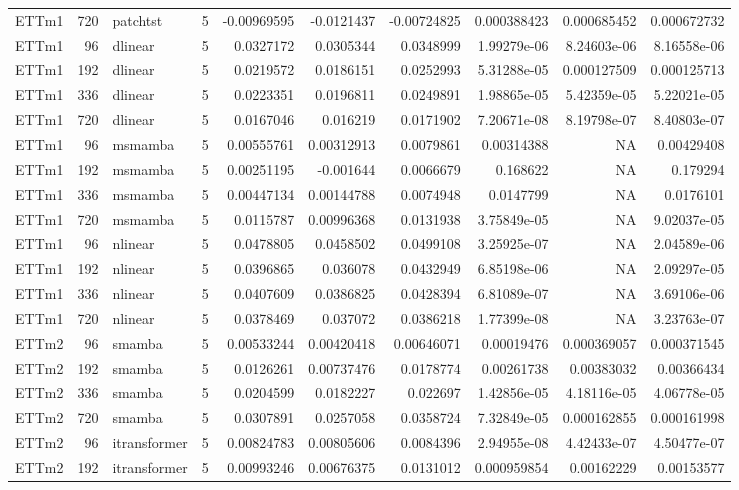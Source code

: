 \begin{longtable}{lrllrrrrrr}
ETTm1 & 720 & patchtst & 5 & -0.00969595 & -0.0121437 & -0.00724825 & 0.000388423 & 0.000685452 & 0.000672732 \\
ETTm1 & 96 & dlinear & 5 & 0.0327172 & 0.0305344 & 0.0348999 & 1.99279e-06 & 8.24603e-06 & 8.16558e-06 \\
ETTm1 & 192 & dlinear & 5 & 0.0219572 & 0.0186151 & 0.0252993 & 5.31288e-05 & 0.000127509 & 0.000125713 \\
ETTm1 & 336 & dlinear & 5 & 0.0223351 & 0.0196811 & 0.0249891 & 1.98865e-05 & 5.42359e-05 & 5.22021e-05 \\
ETTm1 & 720 & dlinear & 5 & 0.0167046 & 0.016219 & 0.0171902 & 7.20671e-08 & 8.19798e-07 & 8.40803e-07 \\
ETTm1 & 96 & msmamba & 5 & 0.00555761 & 0.00312913 & 0.0079861 & 0.00314388 & NA & 0.00429408 \\
ETTm1 & 192 & msmamba & 5 & 0.00251195 & -0.001644 & 0.0066679 & 0.168622 & NA & 0.179294 \\
ETTm1 & 336 & msmamba & 5 & 0.00447134 & 0.00144788 & 0.0074948 & 0.0147799 & NA & 0.0176101 \\
ETTm1 & 720 & msmamba & 5 & 0.0115787 & 0.00996368 & 0.0131938 & 3.75849e-05 & NA & 9.02037e-05 \\
ETTm1 & 96 & nlinear & 5 & 0.0478805 & 0.0458502 & 0.0499108 & 3.25925e-07 & NA & 2.04589e-06 \\
ETTm1 & 192 & nlinear & 5 & 0.0396865 & 0.036078 & 0.0432949 & 6.85198e-06 & NA & 2.09297e-05 \\
ETTm1 & 336 & nlinear & 5 & 0.0407609 & 0.0386825 & 0.0428394 & 6.81089e-07 & NA & 3.69106e-06 \\
ETTm1 & 720 & nlinear & 5 & 0.0378469 & 0.037072 & 0.0386218 & 1.77399e-08 & NA & 3.23763e-07 \\
ETTm2 & 96 & smamba & 5 & 0.00533244 & 0.00420418 & 0.00646071 & 0.00019476 & 0.000369057 & 0.000371545 \\
ETTm2 & 192 & smamba & 5 & 0.0126261 & 0.00737476 & 0.0178774 & 0.00261738 & 0.00383032 & 0.00366434 \\
ETTm2 & 336 & smamba & 5 & 0.0204599 & 0.0182227 & 0.022697 & 1.42856e-05 & 4.18116e-05 & 4.06778e-05 \\
ETTm2 & 720 & smamba & 5 & 0.0307891 & 0.0257058 & 0.0358724 & 7.32849e-05 & 0.000162855 & 0.000161998 \\
ETTm2 & 96 & itransformer & 5 & 0.00824783 & 0.00805606 & 0.0084396 & 2.94955e-08 & 4.42433e-07 & 4.50477e-07 \\
ETTm2 & 192 & itransformer & 5 & 0.00993246 & 0.00676375 & 0.0131012 & 0.000959854 & 0.00162229 & 0.00153577 \\

\end{longtable}
